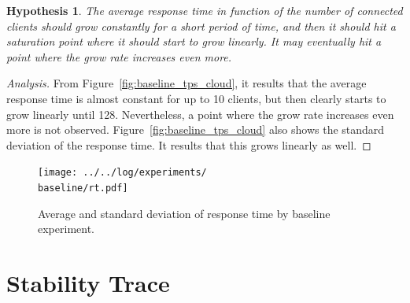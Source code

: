 \documentclass[11pt]{article}
\newtheorem{hyp}{Hypothesis}
\theoremstyle{definition}
\newenvironment{ana}[1][\proofname]{\begin{proof}[Analysis]}{\end{proof}}
\newcommand\baseline{01_memcached_baselines_16-10-21_08:20:35}
\begin{document}
\begin{hyp}
    The average response time in function of the number of connected clients should grow constantly for a short period of time, and then it should hit a saturation point where it should start to grow linearly.
    It may eventually hit a point where the grow rate increases even more.
\end{hyp}

\begin{ana}
    From Figure~\ref{fig:baseline_tps_cloud}, it results that the average response time is almost constant for up to 10 clients, but then clearly starts to grow linearly until 128.
    Nevertheless, a point where the grow rate increases even more is not observed.
    Figure~\ref{fig:baseline_tps_cloud} also shows the standard deviation of the response time.
    It results that this grows linearly as well.
\end{ana}

\clearpage

\begin{figure}[!h]
    \centering
    \texttt{[image: ../../log/experiments/\\baseline/rt.pdf]}
    \caption{Average and standard deviation of response time by baseline experiment.}
    \label{fig:baseline_rt_cloud}
\end{figure}

\section{Stability Trace}\label{sec:trace}
\end{document}
